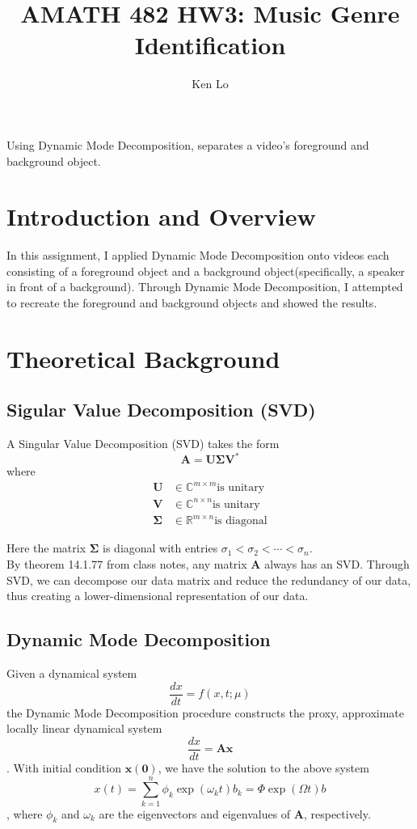 \documentclass[12pt, a4paper]{article}
\begin{document}
\author{Ken Lo}
\title{AMATH 482 HW3: Music Genre Identification}
\maketitle

\abstract
Using Dynamic Mode Decomposition, separates a video's foreground and background object.


\section{Introduction and Overview}
In this assignment, I applied Dynamic Mode Decomposition onto videos each consisting of a foreground object and a background object(specifically, a speaker in front of a background). Through Dynamic Mode Decomposition, I attempted to recreate the foreground and background objects and showed the results.

\section{Theoretical Background}
\subsection{Sigular Value Decomposition (SVD)}
A Singular Value Decomposition (SVD) takes the form
$$\mathbf{A} = \mathbf{U\Sigma V^*}$$
where
\begin{align*}
\mathbf{U} &\in \mathbb{C}^{m\times m} \text{is unitary}\\
\mathbf{V} &\in \mathbb{C}^{n \times n} \text{is unitary}\\
\mathbf{\Sigma} &\in \mathbb{R}^{m \times n} \text{is diagonal}
\end{align*}

Here the matrix $\mathbf{\Sigma}$ is diagonal with entries $\sigma_1 < \sigma_2 < \cdots < \sigma_n$.\\

By theorem 14.1.77 from class notes, any matrix $\mathbf{A}$ always has an SVD. Through SVD, we can decompose our data matrix and reduce the redundancy of our data, thus creating a lower-dimensional representation of our data. 

\subsection{Dynamic Mode Decomposition}
Given a dynamical system
$$\frac{dx}{dt} = f(x,t;\mu)$$
the Dynamic Mode Decomposition procedure constructs the proxy, approximate locally linear dynamical system
$$\frac{dx}{dt} = \mathbf{Ax}$$.
With initial condition $\mathbf{x(0)}$, we have the solution to the above system
$$x(t) = \sum_{k=1}^n \phi_k \exp(\omega_k t)b_k = \Phi \exp(\Omega t)b$$,
where $\phi_k$ and $\omega_k$ are the eigenvectors and eigenvalues of $\mathbf{A}$, respectively. 
\end{document}
